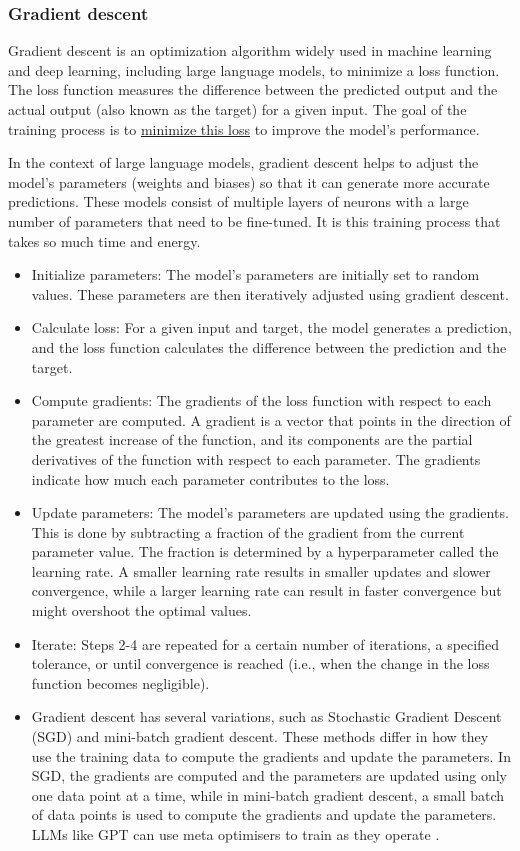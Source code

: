 \subsubsection{Gradient descent}
Gradient descent is an optimization algorithm widely used in machine learning and deep learning, including large language models, to minimize a loss function. The loss function measures the difference between the predicted output and the actual output (also known as the target) for a given input. The goal of the training process is to \href{https://societyofai.medium.com/gradient-descent-basics-and-application-1cef98179ee6}{minimize this loss} to improve the model's performance.\par
In the context of large language models, gradient descent helps to adjust the model's parameters (weights and biases) so that it can generate more accurate predictions. These models consist of multiple layers of neurons with a large number of parameters that need to be fine-tuned. It is this training process that takes so much time and energy.
\begin{itemize}
\item Initialize parameters: The model's parameters are initially set to random values. These parameters are then iteratively adjusted using gradient descent.
\item Calculate loss: For a given input and target, the model generates a prediction, and the loss function calculates the difference between the prediction and the target.
\item Compute gradients: The gradients of the loss function with respect to each parameter are computed. A gradient is a vector that points in the direction of the greatest increase of the function, and its components are the partial derivatives of the function with respect to each parameter. The gradients indicate how much each parameter contributes to the loss.
\item Update parameters: The model's parameters are updated using the gradients. This is done by subtracting a fraction of the gradient from the current parameter value. The fraction is determined by a hyperparameter called the learning rate. A smaller learning rate results in smaller updates and slower convergence, while a larger learning rate can result in faster convergence but might overshoot the optimal values.
\item Iterate: Steps 2-4 are repeated for a certain number of iterations, a specified tolerance, or until convergence is reached (i.e., when the change in the loss function becomes negligible).
\item Gradient descent has several variations, such as Stochastic Gradient Descent (SGD) and mini-batch gradient descent. These methods differ in how they use the training data to compute the gradients and update the parameters. In SGD, the gradients are computed and the parameters are updated using only one data point at a time, while in mini-batch gradient descent, a small batch of data points is used to compute the gradients and update the parameters. LLMs like GPT can use meta optimisers to train as they operate \cite{dai2022can}.
\end{itemize}
